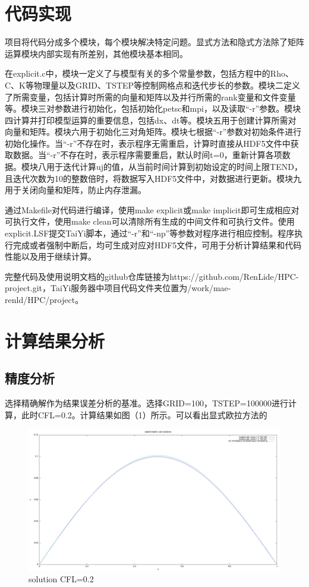 \documentclass[final]{cvpr}
\begin{document}
\section{代码实现}
\label{sec:RelatedWorks}
项目将代码分成多个模块，每个模块解决特定问题。显式方法和隐式方法除了矩阵运算模块内部实现有所差别，其他模块基本相同。

在explicit.c中，模块一定义了与模型有关的多个常量参数，包括方程中的Rho、C、K等物理量以及GRID、TSTEP等控制网格点和迭代步长的参数。模块二定义了所需变量，包括计算时所需的向量和矩阵以及并行所需的rank变量和文件变量等。模块三对参数进行初始化，包括初始化petsc和mpi，以及读取“-r”参数。模块四计算并打印模型运算的重要信息，包括dx、dt等。模块五用于创建计算所需对向量和矩阵。模块六用于初始化三对角矩阵。模块七根据“-r”参数对初始条件进行初始化操作。当“-r”不存在时，表示程序无需重启，计算时直接从HDF5文件中获取数据。当“-r”不存在时，表示程序需要重启，默认时间t=0，重新计算各项数据。模块八用于迭代计算uj的值，从当前时间计算到初始设定的时间上限TEND，且迭代次数为10的整数倍时，将数据写入HDF5文件中，对数据进行更新。模块九用于关闭向量和矩阵，防止内存泄漏。

通过Makefile对代码进行编译，使用make explicit或make implicit即可生成相应对可执行文件，使用make clean可以清除所有生成的中间文件和可执行文件。使用explicit.LSF提交TaiYi脚本，通过“-r”和“-np”等参数对程序进行相应控制。程序执行完成或者强制中断后，均可生成对应对HDF5文件，可用于分析计算结果和代码性能以及用于继续计算。

完整代码及使用说明文档的github仓库链接为https://github.com/RenLide/HPC-project.git，TaiYi服务器中项目代码文件夹位置为/work/mae-renld/HPC/project。




\section{计算结果分析}\label{sec:HC}
\subsection{精度分析}
选择精确解作为结果误差分析的基准。选择GRID=100，TSTEP=100000进行计算，此时CFL=0.2。计算结果如图（1）所示。可以看出显式欧拉方法的
\begin{figure}[htbp]
	\centering
	\includegraphics[scale=0.15]{./figures/solution_CFL0.2.png}
	\caption{solution CFL=0.2}
	\label{figure}
\end{figure}
\end{document}
